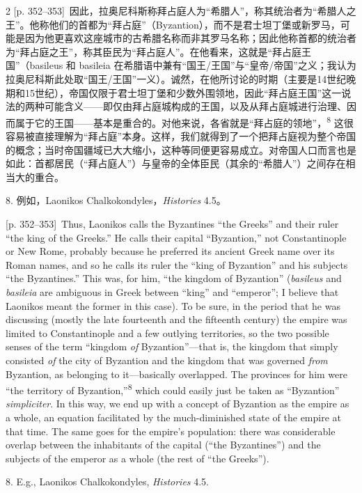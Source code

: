 \documentclass[10pt,a4paper]{article}
\begin{document}
\begin{paracol}{2}
{\scriptsize\color{gray}[p. 352–353]}\ 因此，拉奥尼科斯称拜占庭人为“希腊人”，称其统治者为“希腊人之王”。他称他们的首都为“拜占庭”（Byzantion），而不是君士坦丁堡或新罗马，可能是因为他更喜欢这座城市的古希腊名称而非其罗马名称；因此他称首都的统治者为“拜占庭之王”，称其臣民为“拜占庭人”。在他看来，这就是“拜占庭王国”（basileus 和 basileia 在希腊语中兼有“国王/王国”与“皇帝/帝国”之义；我认为拉奥尼科斯此处取“国王/王国”一义）。诚然，在他所讨论的时期（主要是14世纪晚期和15世纪），帝国仅限于君士坦丁堡和少数外围领地，因此“拜占庭王国”这一说法的两种可能含义——即仅由拜占庭城构成的王国，以及从拜占庭城进行治理、因而属于它的王国——基本是重合的。对他来说，各省就是“拜占庭的领地”，\nobreak\textsuperscript{8} 这很容易被直接理解为“拜占庭”本身。这样，我们就得到了一个把拜占庭视为整个帝国的概念；当时帝国疆域已大大缩小，这种等同便更容易成立。对帝国人口而言也是如此：首都居民（“拜占庭人”）与皇帝的全体臣民（其余的“希腊人”）之间存在相当大的重合。\par{\small 8. 例如，Laonikos Chalkokondyles，\textit{Histories} 4.5。\par}
\switchcolumn
{\scriptsize\color{gray}[p. 352–353]}\ Thus, Laonikos calls the Byzantines “the Greeks” and their ruler “the king of the Greeks.” He calls their capital “Byzantion,” not Constantinople or New Rome, probably because he preferred its ancient Greek name over its Roman names, and so he calls its ruler the “king of Byzantion” and his subjects “the Byzantines.” This was, for him, “the kingdom of Byzantion” (\textit{basileus} and \textit{basileia} are ambiguous in Greek between “king” and “emperor”; I believe that Laonikos meant the former in this case). To be sure, in the period that he was discussing (mostly the late fourteenth and the fifteenth century) the empire was limited to Constantinople and a few outlying territories, so the two possible senses of the term “kingdom \textit{of} Byzantion”—that is, the kingdom that simply consisted \textit{of} the city of Byzantion and the kingdom that was governed \textit{from} Byzantion, as belonging to it—basically overlapped. The provinces for him were “the territory of Byzantion,”\nobreak\textsuperscript{8} which could easily just be taken as “Byzantion” \textit{simpliciter}. In this way, we end up with a concept of Byzantion as the empire as a whole, an equation facilitated by the much-diminished state of the empire at that time. The same goes for the empire’s population: there was considerable overlap between the inhabitants of the capital (“the Byzantines”) and the subjects of the emperor as a whole (the rest of “the Greeks”).\par{\small 8.  E.g., Laonikos Chalkokondyles, \textit{Histories} 4.5.\par}

\end{paracol}
\end{document}
